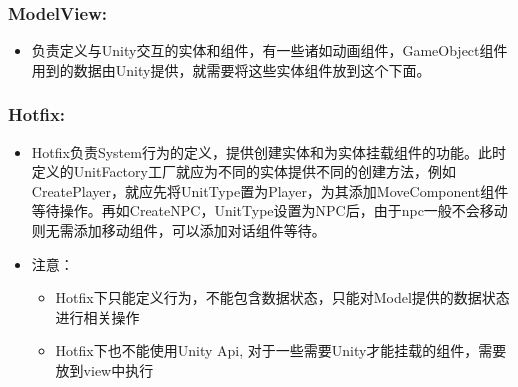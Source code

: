 \documentclass[9pt, b5paper]{article}
\begin{document}
\subsubsection{ModelView:}
\label{sec:org81a9e13}
\begin{itemize}
\item 负责定义与Unity交互的实体和组件，有一些诸如动画组件，GameObject组件用到的数据由Unity提供，就需要将这些实体组件放到这个下面。
\end{itemize}
\subsubsection{Hotfix:}
\label{sec:orgc892e3a}
\begin{itemize}
\item Hotfix负责System行为的定义，提供创建实体和为实体挂载组件的功能。此时定义的UnitFactory工厂就应为不同的实体提供不同的创建方法，例如CreatePlayer，就应先将UnitType置为Player，为其添加MoveComponent组件等待操作。再如CreateNPC，UnitType设置为NPC后，由于npc一般不会移动则无需添加移动组件，可以添加对话组件等待。
\item 注意：
\begin{itemize}
\item Hotfix下只能定义行为，不能包含数据状态，只能对Model提供的数据状态进行相关操作
\item Hotfix下也不能使用Unity Api, 对于一些需要Unity才能挂载的组件，需要放到view中执行
\end{itemize}
\end{itemize}
\end{document}
